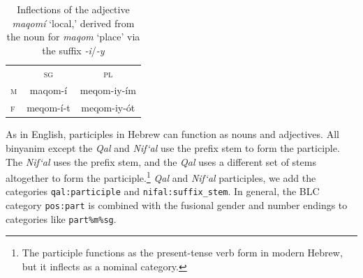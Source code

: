 {\begin{description}
\begin{table}[bt]
\centering
\small
\setlength{\extrarowheight}{8pt}
\begin{tabular}{lcc}
\toprule
& \textsc{sg} & \textsc{pl}  \\
\cmidrule(lr){2-3}
\textsc{m} & maqom-\'{i} &  meqom-iy-\'{i}m\\
\textsc{f} & meqom-\'{i}-t  & meqom-iy-\'{o}t  \\
\bottomrule
\end{tabular}
\label{tab:der-adjs}
\caption{Inflections of the adjective \textit{maqom\'{i}} `local,' derived from the noun for \textit{maqom} `place' via the suffix \textit{-i}/\textit{-y}}
\end{table}




\item[Participles.]
As in English, participles in Hebrew can function as nouns and adjectives.
All binyanim except the \textit{Qal} and \textit{Nif`al} use 
the prefix stem to form the participle. The \textit{Nif`al} uses the prefix stem, 
and the \textit{Qal} uses a different set of stems altogether to form the 
participle.\footnote{The participle functions as the present-tense verb form in modern Hebrew, but it inflects as a nominal category.}
\textit{Qal} and \textit{Nif`al} participles, we add the categories \texttt{qal:participle} 
and \texttt{nifal:suffix\_stem}.  In general, the BLC category \texttt{pos:part} 
is combined with the fusional gender and number endings to categories like \texttt{part\%m\%sg}.


\end{description}}
